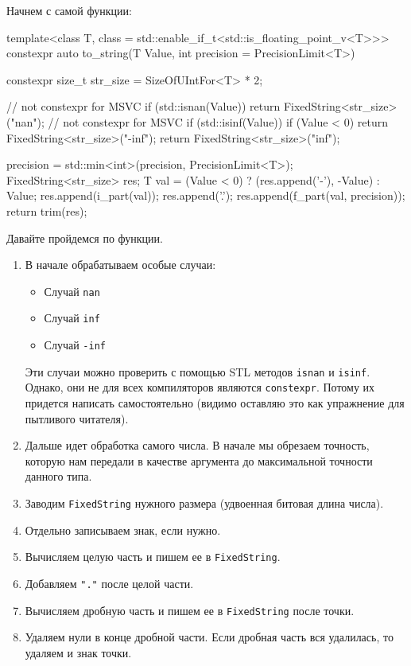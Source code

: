 Начнем с самой функции:
\begin{cppcode}
template<class T, class = std::enable_if_t<std::is_floating_point_v<T>>>
constexpr auto to_string(T Value, int precision = PrecisionLimit<T>) {
  constexpr size_t str_size = SizeOfUIntFor<T> * 2;

  // not constexpr for MSVC
  if (std::isnan(Value)) {
    return FixedString<str_size>("nan");
  }
  // not constexpr for MSVC
  if (std::isinf(Value)) {
    if (Value < 0)
      return FixedString<str_size>("-inf");
    return FixedString<str_size>("inf");
  }

  precision = std::min<int>(precision, PrecisionLimit<T>);
  FixedString<str_size> res;
  T val = (Value < 0) ? (res.append('-'), -Value) : Value;
  res.append(i_part(val));
  res.append('.');
  res.append(f_part(val, precision));
  return trim(res);
}
\end{cppcode}
Давайте пройдемся по функции.
\begin{enumerate}
\item В начале обрабатываем особые случаи:
\begin{itemize}
\item Случай \verb"nan"

\item Случай \verb"inf"

\item Случай \verb"-inf"
\end{itemize}
Эти случаи можно проверить с помощью STL методов \verb"isnan" и \verb"isinf".
Однако, они не для всех компиляторов являются \verb"constexpr".
Потому их придется написать самостоятельно (видимо оставляю это как упражнение для пытливого читателя).

\item Дальше идет обработка самого числа.
В начале мы обрезаем точность, которую нам передали в качестве аргумента до максимальной точности данного типа.

\item Заводим \verb"FixedString" нужного размера (удвоенная битовая длина числа).

\item Отдельно записываем знак, если нужно.

\item Вычисляем целую часть и пишем ее в \verb"FixedString".

\item Добавляем \verb$"."$ после целой части.

\item Вычисляем дробную часть и пишем ее в \verb"FixedString" после точки.

\item Удаляем нули в конце дробной части.
Если дробная часть вся удалилась, то удаляем и знак точки.
\end{enumerate}
